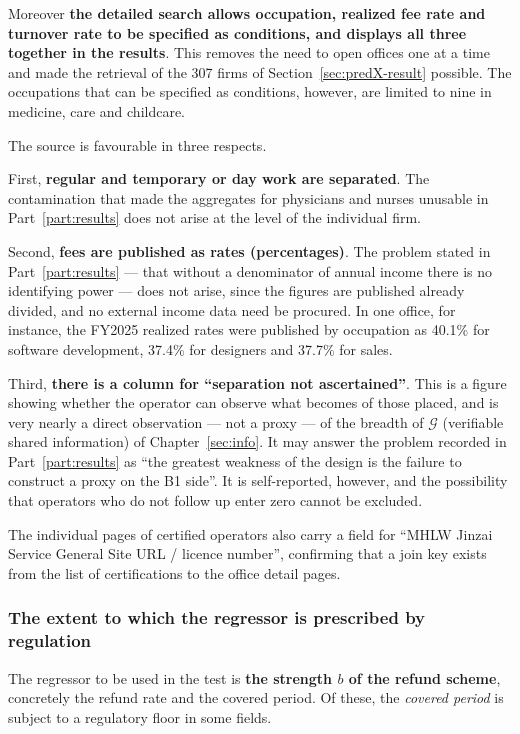 Moreover \textbf{the detailed search allows occupation, realized fee rate and turnover rate to be
specified as conditions, and displays all three together in the results}. This removes the need to
open offices one at a time and made the retrieval of the 307 firms of
Section~\ref{sec:predX-result} possible. The occupations that can be specified as conditions,
however, are limited to nine in medicine, care and childcare.

The source is favourable in three respects.

First, \textbf{regular and temporary or day work are separated}. The contamination that made the
aggregates for physicians and nurses unusable in Part~\ref{part:results} does not arise at the
level of the individual firm.

Second, \textbf{fees are published as rates (percentages)}. The problem stated in
Part~\ref{part:results} — that without a denominator of annual income there is no identifying
power — does not arise, since the figures are published already divided, and no external income
data need be procured. In one office, for instance, the FY2025 realized rates were published by
occupation as 40.1\% for software development, 37.4\% for designers and 37.7\% for sales.

Third, \textbf{there is a column for ``separation not ascertained''}. This is a figure showing
whether the operator can observe what becomes of those placed, and is very nearly a direct
observation — not a proxy — of the breadth of $\mathcal{G}$ (verifiable shared information) of
Chapter~\ref{sec:info}. It may answer the problem recorded in Part~\ref{part:results} as ``the
greatest weakness of the design is the failure to construct a proxy on the B1 side''. It is
self-reported, however, and the possibility that operators who do not follow up enter zero cannot
be excluded.

The individual pages of certified operators also carry a field for ``MHLW Jinzai Service General
Site URL / licence number'', confirming that a join key exists from the list of certifications to
the office detail pages.

\subsubsection{The extent to which the regressor is prescribed by regulation}
\label{sec:regulated-regressor}

The regressor to be used in the test is \textbf{the strength $b$ of the refund scheme}, concretely
the refund rate and the covered period. Of these, the \emph{covered period} is subject to a
regulatory floor in some fields.


